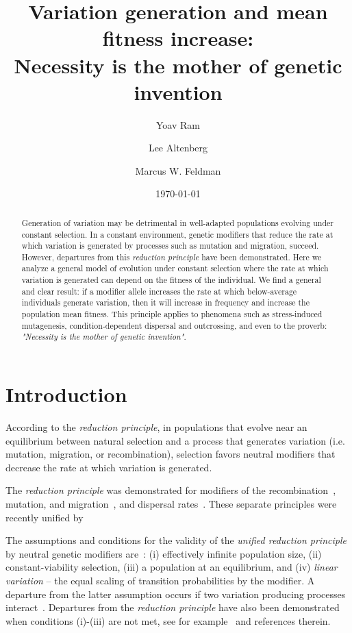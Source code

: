 \documentclass[9pt, a4paper, twocolumn]{extarticle}
\title{Variation generation and mean fitness increase: \\ Necessity is the mother of genetic invention}
\author[a]{Yoav Ram}
\author[b]{Lee Altenberg}
\author[a]{Marcus W. Feldman}
\affil[a]{Department of Biology, Stanford University, Stanford, CA}
\affil[b]{Information and Computer Sciences, University of Hawai`i at M{\=a}noa, Honolulu, HI}
\date{\today}
\begin{document}
\maketitle

\begin{abstract}
Generation of variation may be detrimental in well-adapted populations evolving under constant selection.
In a constant environment, genetic modifiers that reduce the rate at which variation is generated by processes such as mutation and migration, succeed.
However, departures from this \emph{reduction principle} have been demonstrated.
Here we analyze a general model of evolution under constant selection where the rate at which variation is generated can depend on the fitness of the individual.
We find a general and clear result:
if a modifier allele increases the rate at which below-average individuals generate variation, then it will increase in frequency and increase the  population mean fitness.
This principle applies to phenomena such as stress-induced mutagenesis, condition-dependent dispersal and outcrossing,
and even to the proverb: \emph{"Necessity is the mother of genetic invention"}.
\end{abstract}

\section*{Introduction}

According to the \emph{reduction principle}, in populations that evolve near an equilibrium between natural selection and a process that generates variation (i.e. mutation, migration, or recombination), selection favors neutral modifiers that decrease the rate at which variation is generated. 

The \emph{reduction principle} was demonstrated for modifiers of the recombination~\citep{Feldman1972}, mutation, and migration~\citep{Liberman1986a}, and dispersal rates~\citep{Altenberg1987}.
These separate principles were recently unified by~\citet{Altenberg2017}

The assumptions and conditions for the validity of the \emph{unified reduction principle} by neutral genetic modifiers are~\citep{Altenberg2017}:
(i) effectively infinite population size, (ii) constant-viability selection, (iii) a population at an equilibrium, and (iv) \emph{linear variation} -- the equal scaling of transition probabilities by the modifier.
A departure from the latter assumption occurs if two variation producing processes interact~\citep{Feldman1980,Altenberg2012}.
Departures from the \emph{reduction principle} have also been demonstrated when conditions (i)-(iii) are not met, see for example~\citet{Holsinger1986} and references therein.
\end{document}
